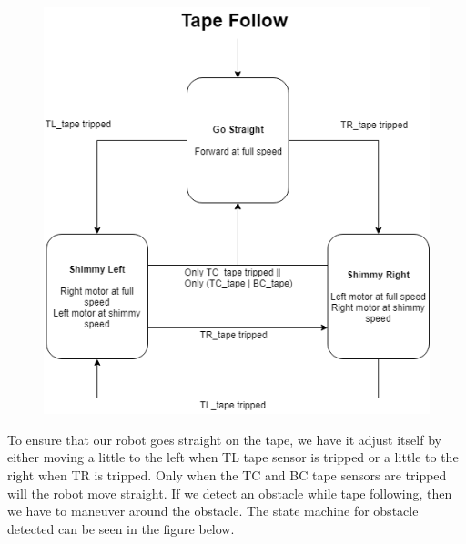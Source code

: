 \documentclass{article}
\begin{document}
\begin{figure}[H]
    \centering
    \includegraphics[scale = 0.5]{TapeFollow.png}
\end{figure}

To ensure that our robot goes straight on the tape, we have it adjust itself by either moving a little to the left when TL tape sensor is tripped or a little to the right when TR is tripped.  Only when the TC and BC tape sensors are tripped will the robot move straight.  If we detect an obstacle while tape following, then we have to maneuver around the obstacle.  The state machine for obstacle detected can be seen in the figure below.    
\end{document}
